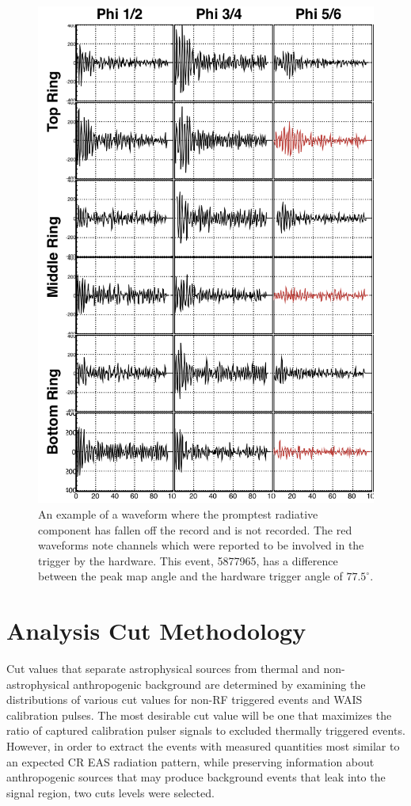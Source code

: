 \begin{figure}
	\centering
	\includegraphics[height=0.9\textheight]{figures/EarlyWaveform}
	\caption{An example of a waveform where the promptest radiative component has fallen off the record and is not recorded.  The red waveforms note channels which were reported to be involved in the trigger by the hardware.  This event, 5877965, has a difference between the peak map angle and the hardware trigger angle of $77.5^\circ$.} 
	\label{fig:earlyWaveform}
\end{figure}		
		

\section{Analysis Cut Methodology}%
	Cut values that separate astrophysical sources from thermal and non-astrophysical anthropogenic background are determined by examining the distributions of various cut values for non-RF triggered events and WAIS calibration pulses.  The most desirable cut value will be one that maximizes the ratio of captured calibration pulser signals to excluded thermally triggered events.  However, in order to extract the events with measured quantities most similar to an expected CR EAS radiation pattern, while preserving information about anthropogenic sources that may produce background events that leak into the signal region, two cuts levels were selected.  
	
